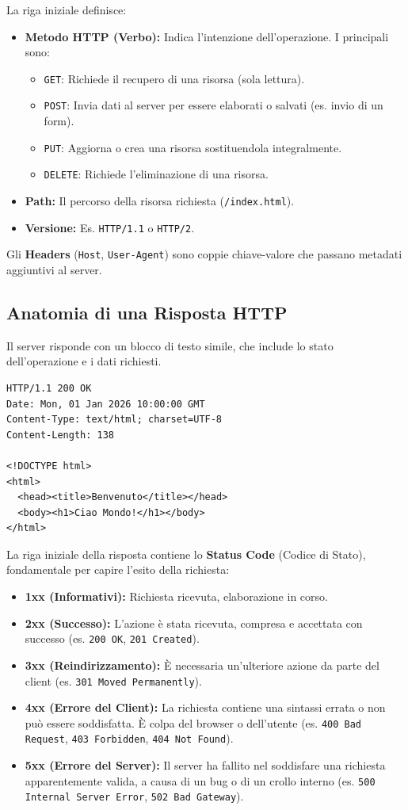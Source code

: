 \documentclass[11pt,a4paper]{report}
\begin{document}
La riga iniziale definisce:
\begin{itemize}
    \item \textbf{Metodo HTTP (Verbo):} Indica l'intenzione dell'operazione. I principali sono:
    \begin{itemize}
        \item \texttt{GET}: Richiede il recupero di una risorsa (sola lettura).
        \item \texttt{POST}: Invia dati al server per essere elaborati o salvati (es. invio di un form).
        \item \texttt{PUT}: Aggiorna o crea una risorsa sostituendola integralmente.
        \item \texttt{DELETE}: Richiede l'eliminazione di una risorsa.
    \end{itemize}
    \item \textbf{Path:} Il percorso della risorsa richiesta (\texttt{/index.html}).
    \item \textbf{Versione:} Es. \texttt{HTTP/1.1} o \texttt{HTTP/2}.
\end{itemize}
Gli \textbf{Headers} (\texttt{Host}, \texttt{User-Agent}) sono coppie chiave-valore che passano metadati aggiuntivi al server.

\subsection{Anatomia di una Risposta HTTP}
Il server risponde con un blocco di testo simile, che include lo stato dell'operazione e i dati richiesti.

\begin{lstlisting}[caption=Esempio di Risposta HTTP cruda]
HTTP/1.1 200 OK
Date: Mon, 01 Jan 2026 10:00:00 GMT
Content-Type: text/html; charset=UTF-8
Content-Length: 138

<!DOCTYPE html>
<html>
  <head><title>Benvenuto</title></head>
  <body><h1>Ciao Mondo!</h1></body>
</html>
\end{lstlisting}

La riga iniziale della risposta contiene lo \textbf{Status Code} (Codice di Stato), fondamentale per capire l'esito della richiesta:
\begin{itemize}
    \item \textbf{1xx (Informativi):} Richiesta ricevuta, elaborazione in corso.
    \item \textbf{2xx (Successo):} L'azione è stata ricevuta, compresa e accettata con successo (es. \texttt{200 OK}, \texttt{201 Created}).
    \item \textbf{3xx (Reindirizzamento):} È necessaria un'ulteriore azione da parte del client (es. \texttt{301 Moved Permanently}).
    \item \textbf{4xx (Errore del Client):} La richiesta contiene una sintassi errata o non può essere soddisfatta. È colpa del browser o dell'utente (es. \texttt{400 Bad Request}, \texttt{403 Forbidden}, \texttt{404 Not Found}).
    \item \textbf{5xx (Errore del Server):} Il server ha fallito nel soddisfare una richiesta apparentemente valida, a causa di un bug o di un crollo interno (es. \texttt{500 Internal Server Error}, \texttt{502 Bad Gateway}).
\end{itemize}
\end{document}
